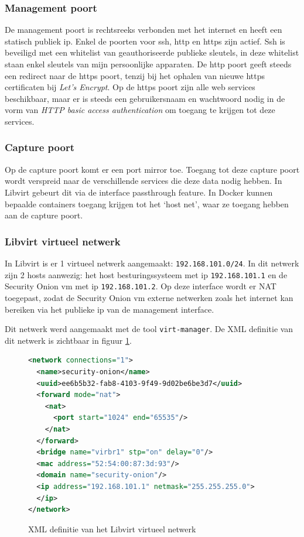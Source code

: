 \documentclass[a4paper,12pt]{report}
\begin{document}
\subsubsection{Management poort}
De management poort is rechtsreeks verbonden met het internet en heeft een statisch publiek ip.
Enkel de poorten voor ssh, http en https zijn actief.
Ssh is beveiligd met een whitelist van geauthoriseerde publieke sleutels, in deze whitelist staan enkel sleutels van mijn persoonlijke apparaten.
De http poort geeft steeds een redirect naar de https poort, tenzij bij het ophalen van nieuwe https certificaten bij \emph{Let's Encrypt}.
Op de https poort zijn alle web services beschikbaar, maar er is steeds een gebruikersnaam en wachtwoord nodig in de vorm van \emph{HTTP basic access authentication} om toegang te krijgen tot deze services.

\subsubsection{Capture poort}
Op de capture poort komt er een port mirror toe.
Toegang tot deze capture poort wordt verspreid naar de verschillende services die deze data nodig hebben.
In Libvirt gebeurt dit via de interface passthrough feature.
In Docker kunnen bepaalde containers toegang krijgen tot het `host net', waar ze toegang hebben aan de capture poort.

\subsubsection{Libvirt virtueel netwerk}
In Libvirt is er 1 virtueel netwerk aangemaakt: \lstinline|192.168.101.0/24|.
In dit netwerk zijn 2 hosts aanwezig: het host besturingssysteem met ip \lstinline|192.168.101.1| en de Security Onion vm met ip \lstinline|192.168.101.2|.
Op deze interface wordt er NAT toegepast, zodat de Security Onion vm externe netwerken zoals het internet kan bereiken via het publieke ip van de management interface.

Dit netwerk werd aangemaakt met de tool \lstinline|virt-manager|.
De XML definitie van dit netwerk is zichtbaar in figuur \ref{fig:libvirt-network-xml}.

\begin{figure}[H]
  \begin{lstlisting}[language=XML]
<network connections="1">
  <name>security-onion</name>
  <uuid>ee6b5b32-fab8-4103-9f49-9d02be6be3d7</uuid>
  <forward mode="nat">
    <nat>
      <port start="1024" end="65535"/>
    </nat>
  </forward>
  <bridge name="virbr1" stp="on" delay="0"/>
  <mac address="52:54:00:87:3d:93"/>
  <domain name="security-onion"/>
  <ip address="192.168.101.1" netmask="255.255.255.0">
  </ip>
</network>
  \end{lstlisting}
  \caption{XML definitie van het Libvirt virtueel netwerk}
  \label{fig:libvirt-network-xml}
\end{figure}
\end{document}

